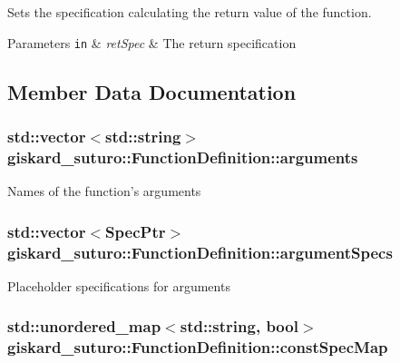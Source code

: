 Sets the specification calculating the return value of the function. 


\begin{DoxyParams}[1]{Parameters}
\mbox{\tt in}  & {\em ret\-Spec} & The return specification \\
\hline
\end{DoxyParams}


\subsection{Member Data Documentation}
\hypertarget{classgiskard__suturo_1_1FunctionDefinition_a6e58c097c4e9e1c97522d394d03ca080}{
\subsubsection[{arguments}]{\setlength{\rightskip}{0pt plus 5cm}std\-::vector$<$std\-::string$>$ giskard\-\_\-suturo\-::\-Function\-Definition\-::arguments\hspace{0.3cm}{\ttfamily [private]}}}\label{classgiskard__suturo_1_1FunctionDefinition_a6e58c097c4e9e1c97522d394d03ca080}
Names of the function's arguments \hypertarget{classgiskard__suturo_1_1FunctionDefinition_aca5605f42cc4324a219b2fe1d2f53043}{
\subsubsection[{argument\-Specs}]{\setlength{\rightskip}{0pt plus 5cm}std\-::vector$<$Spec\-Ptr$>$ giskard\-\_\-suturo\-::\-Function\-Definition\-::argument\-Specs\hspace{0.3cm}{\ttfamily [private]}}}\label{classgiskard__suturo_1_1FunctionDefinition_aca5605f42cc4324a219b2fe1d2f53043}
Placeholder specifications for arguments \hypertarget{classgiskard__suturo_1_1FunctionDefinition_a824d669129fe7829e3df3f4fd1a3fb9a}{
\subsubsection[{const\-Spec\-Map}]{\setlength{\rightskip}{0pt plus 5cm}std\-::unordered\-\_\-map$<$std\-::string, bool$>$ giskard\-\_\-suturo\-::\-Function\-Definition\-::const\-Spec\-Map\hspace{0.3cm}{\ttfamily [private]}}}\label{classgiskard__suturo_1_1FunctionDefinition_a824d669129fe7829e3df3f4fd1a3fb9a}
